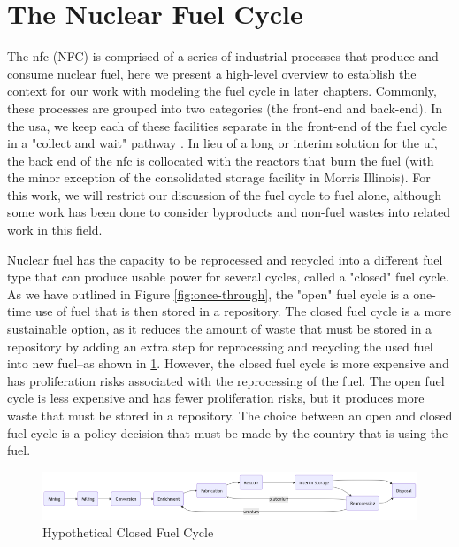 \section{The Nuclear Fuel Cycle}
\label{sec:nfc}

The \acrlong{nfc} (NFC) is comprised of a series of industrial processes that produce and consume nuclear fuel, here we present a high-level overview to establish the context for our work with modeling the fuel cycle in later chapters. Commonly, these processes are grouped into two categories (the front-end and back-end). In the \gls{usa}, we keep each of these facilities separate in the front-end of the fuel cycle in a "collect and wait" pathway \cite{cycle_risks}. In lieu of a long or interim solution for the \gls{uf}, the back end of the \gls{nfc} is collocated with the reactors that burn the fuel (with the minor exception of the consolidated storage facility in Morris Illinois). For this work, we will restrict our discussion of the fuel cycle to fuel alone, although some work has been done to consider byproducts and non-fuel wastes into related work in this field.


Nuclear fuel has the capacity to be reprocessed and recycled into a different fuel type that can produce usable power for several cycles, called a "closed" fuel cycle. As we have outlined in Figure \ref{fig:once-through}, the "open" fuel cycle is a one-time use of fuel that is then stored in a repository. The closed fuel cycle is a more sustainable option, as it reduces the amount of waste that must be stored in a repository by adding an extra step for reprocessing and recycling the used fuel into new fuel--as shown in \ref{fig:closed_fc}. However, the closed fuel cycle is more expensive and has proliferation risks associated with the reprocessing of the fuel. The open fuel cycle is less expensive and has fewer proliferation risks, but it produces more waste that must be stored in a repository. The choice between an open and closed fuel cycle is a policy decision that must be made by the country that is using the fuel.

\begin{figure}
      \centering
      \includegraphics[scale=0.55]{images/nfc/closed_fc.png}
      \caption{Hypothetical Closed Fuel Cycle}
      \label{fig:closed_fc}
\end{figure}

